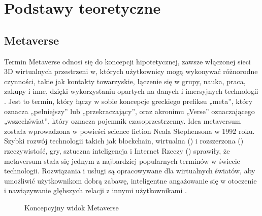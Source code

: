 
\chapter{Podstawy teoretyczne}
\section{Metaverse}


Termin Metaverse odnosi się do koncepcji hipotetycznej, zawsze włączonej sieci 3D wirtualnych przestrzeni w, których użytkownicy mogą wykonywać różnorodne czynności, takie jak kontakty towarzyskie, łączenie się w grupy, nauka, praca, zakupy i inne, dzięki wykorzystaniu opartych na danych i imersyjnych technologii \cite{smartcities5030043}\cite{metaverseDefinitionReview}. Jest to termin, który łączy w sobie koncepcje greckiego prefiksu „meta”, który oznacza „pełniejszy” lub „przekraczający”, oraz akronimu „Verse” oznaczającego „wszechświat”, który oznacza pojemnik czasoprzestrzenny. Idea metaversum została wprowadzona w powieści science fiction Neala Stephensona  w 1992 roku. Szybki rozwój technologii takich jak blockchain, wirtualna () i rozszerzona () rzeczywistość, gry, sztuczna inteligencja i Internet Rzeczy  () sprawiły, że metaversum stała się jednym z najbardziej popularnych terminów w świecie technologii. Rozwiązania i usługi są opracowywane dla wirtualnych światów, aby umożliwić użytkownikom dobrą zabawę, inteligentne angażowanie się w otoczenie i nawiązywanie głębszych relacji z innymi użytkownikami \cite{metaverseAsAService}. 

\begin{figure}[htbp!]
    \centering
    
    \caption{Koncepcyjny widok Metaverse\cite{metaverseUseCaseslee}}
    \label{fig:enter-label}
\end{figure}

